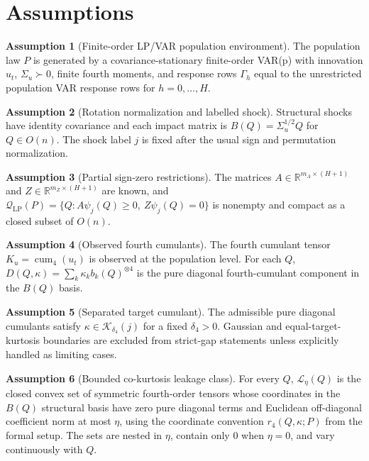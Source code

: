 \documentclass[11pt]{article}
\newcommand{\R}{\mathbb{R}}
\theoremstyle{definition}
\newtheorem{assumption}{Assumption}
\theoremstyle{plain}
\theoremstyle{remark}
\begin{document}
\section{Assumptions}
\begin{assumption}[Finite-order LP/VAR population environment]\label{ass:finite-var}
The population law \(P\) is generated by a covariance-stationary finite-order VAR(p) with innovation \(u_t\), \(\Sigma_u\succ0\), finite fourth moments, and response rows \(\Gamma_h\) equal to the unrestricted population VAR response rows for \(h=0,\ldots,H\).
\end{assumption}

\begin{assumption}[Rotation normalization and labelled shock]\label{ass:normalization}
Structural shocks have identity covariance and each impact matrix is \(B(Q)=\Sigma_u^{1/2}Q\) for \(Q\in O(n)\).  The shock label \(j\) is fixed after the usual sign and permutation normalization.
\end{assumption}

\begin{assumption}[Partial sign-zero restrictions]\label{ass:sign-zero}
The matrices \(A\in\R^{m_A\times(H+1)}\) and \(Z\in\R^{m_Z\times(H+1)}\) are known, and \(\mathcal Q_{\mathrm{LP}}(P)=\{Q:A\psi_j(Q)\ge0,\ Z\psi_j(Q)=0\}\) is nonempty and compact as a closed subset of \(O(n)\).
\end{assumption}

\begin{assumption}[Observed fourth cumulants]\label{ass:cumulants}
The fourth cumulant tensor \(K_u=\operatorname{cum}_4(u_t)\) is observed at the population level.  For each \(Q\), \(D(Q,\kappa)=\sum_k\kappa_kb_k(Q)^{\otimes4}\) is the pure diagonal fourth-cumulant component in the \(B(Q)\) basis.
\end{assumption}

\begin{assumption}[Separated target cumulant]\label{ass:separated-target}
The admissible pure diagonal cumulants satisfy \(\kappa\in\mathcal K_{\delta_4}(j)\) for a fixed \(\delta_4>0\).  Gaussian and equal-target-kurtosis boundaries are excluded from strict-gap statements unless explicitly handled as limiting cases.
\end{assumption}

\begin{assumption}[Bounded co-kurtosis leakage class]\label{ass:leakage-class}
For every \(Q\), \(\mathcal L_\eta(Q)\) is the closed convex set of symmetric fourth-order tensors whose coordinates in the \(B(Q)\) structural basis have zero pure diagonal terms and Euclidean off-diagonal coefficient norm at most \(\eta\), using the coordinate convention \(r_4(Q,\kappa;P)\) from the formal setup.  The sets are nested in \(\eta\), contain only \(0\) when \(\eta=0\), and vary continuously with \(Q\).
\end{assumption}
\end{document}
